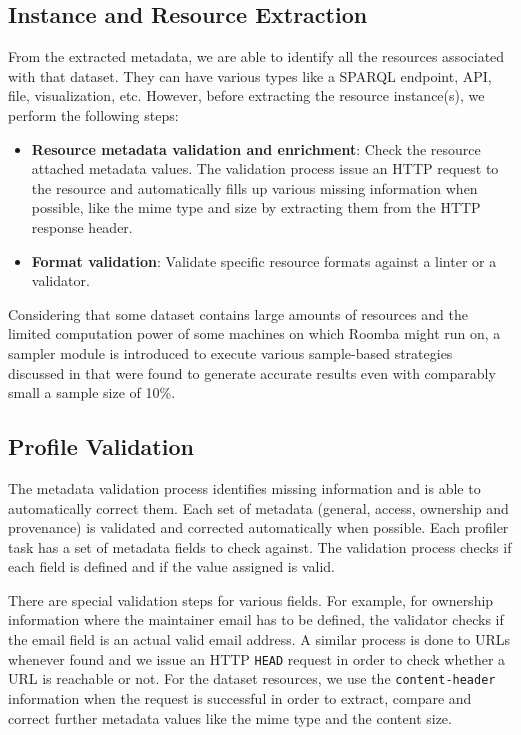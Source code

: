 \documentclass{../../Util/LaTEX/sig-alternate}
\begin{document}
\subsection{Instance and Resource Extraction}
From the extracted metadata, we are able to identify all the resources associated with that dataset. They can have various types like a SPARQL endpoint, API, file, visualization, etc. However, before extracting the resource instance(s), we perform the following steps:
\begin{itemize}
  \item \textbf{Resource metadata validation and enrichment}: Check the resource attached metadata values. The validation process issue an HTTP request to the resource and automatically fills up various missing information when possible, like the mime type and size by extracting them from the HTTP response header.
  \item \textbf{Format validation}: Validate specific resource formats against a linter or a validator.
\end{itemize}

Considering that some dataset contains large amounts of resources and the limited computation power of some machines on which Roomba might run on, a sampler module is introduced to execute various sample-based strategies discussed in \cite{scalableApproach} that were found to generate accurate results even with comparably small a sample size of 10\%.

\subsection{Profile Validation}
The metadata validation process identifies missing information and is able to automatically correct them. Each set of metadata (general, access, ownership and provenance) is validated and corrected automatically when possible. Each profiler task has a set of metadata fields to check against. The validation process checks if each field is defined and if the value assigned is valid.

There are special validation steps for various fields. For example, for ownership information where the maintainer email has to be defined, the validator checks if the email field is an actual valid email address. A similar process is done to URLs whenever found and we issue an HTTP \texttt{HEAD} request in order to check whether a URL is reachable or not. For the dataset resources, we use the \texttt{content-header} information when the request is successful in order to extract, compare and correct further metadata values like the mime type and the content size.
\end{document}
